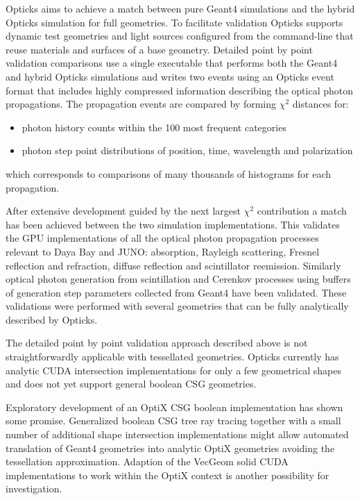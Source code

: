 \documentclass[a4paper]{jpconf}
\begin{document}
Opticks aims to achieve a match between pure Geant4 simulations and the hybrid Opticks simulation 
for full geometries. 
To facilitate validation Opticks supports dynamic test geometries and light sources
configured from the command-line that reuse materials and surfaces of a base geometry.
Detailed point by point validation comparisons use a single executable that performs both
the Geant4 and hybrid Opticks simulations and writes two events using
an Opticks event format that includes highly compressed information
describing the optical photon propagations. The propagation events are compared 
by forming $\chi^{2}$ distances for:
\begin{itemize}
\item photon history counts within the 100 most frequent categories
\item photon step point distributions of position, time, wavelength and polarization 
\end{itemize}
which corresponds to comparisons of many thousands of histograms for each propagation.

After extensive development guided by the next largest $\chi^{2}$ contribution 
a match has been achieved between the two simulation implementations. This validates 
the GPU implementations of all the optical photon propagation processes relevant to Daya Bay and JUNO:
absorption, Rayleigh scattering, Fresnel reflection and refraction, diffuse reflection
and scintillator reemission. Similarly optical photon generation from scintillation and Cerenkov processes
using buffers of generation step parameters collected from Geant4 have been validated.
These validations were performed with several geometries that can be fully analytically described by Opticks.

The detailed point by point validation approach described above is not straightforwardly 
applicable with tessellated geometries. Opticks currently has analytic CUDA intersection implementations 
for only a few geometrical shapes and does not yet support general boolean CSG geometries.

Exploratory development of an OptiX CSG boolean implementation has shown some promise\cite{CSG}.
Generalized boolean CSG tree ray tracing together with a small number of additional shape intersection
implementations might allow automated translation of Geant4 geometries into analytic OptiX geometries
avoiding the tessellation approximation. Adaption of the VecGeom solid CUDA implementations 
to work within the OptiX context is another possibility for investigation.
\end{document}
